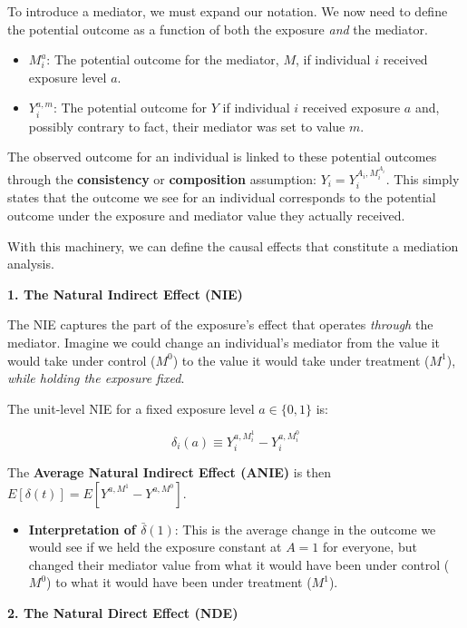 \documentclass[
  10pt,
  letterpaper,
  DIV=11,
  numbers=noendperiod,
  oneside]{scrartcl}
\providecommand{\tightlist}{%
  \setlength{\itemsep}{0pt}\setlength{\parskip}{0pt}}
\begin{document}
To introduce a mediator, we must expand our notation. We now need to
define the potential outcome as a function of both the exposure
\emph{and} the mediator.

\begin{itemize}
\tightlist
\item
  \(M_i^a\): The potential outcome for the mediator, \(M\), if
  individual \(i\) received exposure level \(a\).
\item
  \(Y_i^{a,m}\): The potential outcome for \(Y\) if individual \(i\)
  received exposure \(a\) and, possibly contrary to fact, their mediator
  was set to value \(m\).
\end{itemize}

The observed outcome for an individual is linked to these potential
outcomes through the \textbf{consistency} or \textbf{composition}
assumption: \(Y_i = Y_i^{A_i, M_i^{A_i}}\). This simply states that the
outcome we see for an individual corresponds to the potential outcome
under the exposure and mediator value they actually received.

With this machinery, we can define the causal effects that constitute a
mediation analysis.

\textbf{1. The Natural Indirect Effect (NIE)}

The NIE captures the part of the exposure's effect that operates
\emph{through} the mediator. Imagine we could change an individual's
mediator from the value it would take under control (\(M^0\)) to the
value it would take under treatment (\(M^1\)), \emph{while holding the
exposure fixed}.

The unit-level NIE for a fixed exposure level \(a \in \{0,1\}\) is:

\[
\delta_i(a) \equiv Y_i^{a, M_i^1} - Y_i^{a, M_i^0} 
\]

The \textbf{Average Natural Indirect Effect (ANIE)} is then
\(E[\delta(t)] = E[Y^{a, M^1} - Y^{a, M^0}]\).

\begin{itemize}
\tightlist
\item
  \textbf{Interpretation of \(\bar{\delta}(1)\)}: This is the average
  change in the outcome we would see if we held the exposure constant at
  \(A=1\) for everyone, but changed their mediator value from what it
  would have been under control (\(M^0\)) to what it would have been
  under treatment (\(M^1\)).
\end{itemize}

\textbf{2. The Natural Direct Effect (NDE)}
\end{document}
